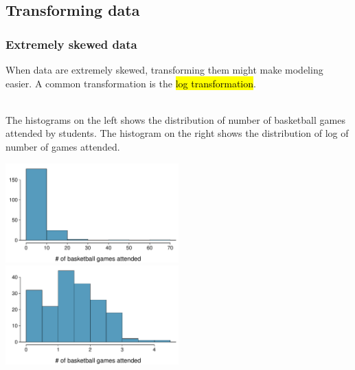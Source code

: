 \subsection{Transforming data}


\begin{frame}
\frametitle{Extremely skewed data}

When data are extremely skewed, transforming them might make modeling easier. A common transformation is the \hl{log transformation}.

$\:$ \\
\pause
The histograms on the left shows the distribution of number of basketball games attended by students. The histogram on the right shows the distribution of log of number of games attended.

\begin{center}
\includegraphics[width=0.5\textwidth]{1-6_numerical_data/figures/basket_games/basket_games_hist}
\includegraphics[width=0.5\textwidth]{1-6_numerical_data/figures/basket_games/basket_games_hist_log}
\end{center}

\end{frame}


